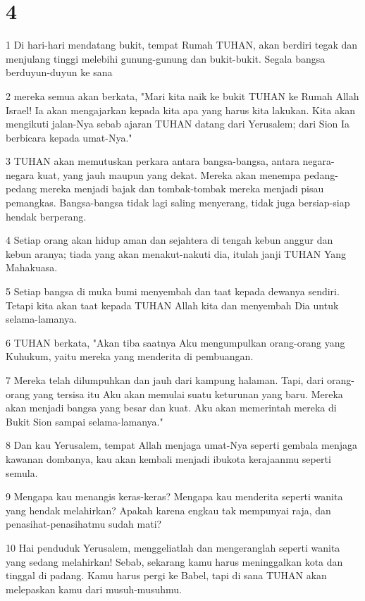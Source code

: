 \chapter{4}

\par 1 Di hari-hari mendatang bukit, tempat Rumah TUHAN, akan berdiri tegak dan menjulang tinggi melebihi gunung-gunung dan bukit-bukit. Segala bangsa berduyun-duyun ke sana
\par 2 mereka semua akan berkata, "Mari kita naik ke bukit TUHAN ke Rumah Allah Israel! Ia akan mengajarkan kepada kita apa yang harus kita lakukan. Kita akan mengikuti jalan-Nya sebab ajaran TUHAN datang dari Yerusalem; dari Sion Ia berbicara kepada umat-Nya."
\par 3 TUHAN akan memutuskan perkara antara bangsa-bangsa, antara negara-negara kuat, yang jauh maupun yang dekat. Mereka akan menempa pedang-pedang mereka menjadi bajak dan tombak-tombak mereka menjadi pisau pemangkas. Bangsa-bangsa tidak lagi saling menyerang, tidak juga bersiap-siap hendak berperang.
\par 4 Setiap orang akan hidup aman dan sejahtera di tengah kebun anggur dan kebun aranya; tiada yang akan menakut-nakuti dia, itulah janji TUHAN Yang Mahakuasa.
\par 5 Setiap bangsa di muka bumi menyembah dan taat kepada dewanya sendiri. Tetapi kita akan taat kepada TUHAN Allah kita dan menyembah Dia untuk selama-lamanya.
\par 6 TUHAN berkata, "Akan tiba saatnya Aku mengumpulkan orang-orang yang Kuhukum, yaitu mereka yang menderita di pembuangan.
\par 7 Mereka telah dilumpuhkan dan jauh dari kampung halaman. Tapi, dari orang-orang yang tersisa itu Aku akan memulai suatu keturunan yang baru. Mereka akan menjadi bangsa yang besar dan kuat. Aku akan memerintah mereka di Bukit Sion sampai selama-lamanya."
\par 8 Dan kau Yerusalem, tempat Allah menjaga umat-Nya seperti gembala menjaga kawanan dombanya, kau akan kembali menjadi ibukota kerajaanmu seperti semula.
\par 9 Mengapa kau menangis keras-keras? Mengapa kau menderita seperti wanita yang hendak melahirkan? Apakah karena engkau tak mempunyai raja, dan penasihat-penasihatmu sudah mati?
\par 10 Hai penduduk Yerusalem, menggeliatlah dan mengeranglah seperti wanita yang sedang melahirkan! Sebab, sekarang kamu harus meninggalkan kota dan tinggal di padang. Kamu harus pergi ke Babel, tapi di sana TUHAN akan melepaskan kamu dari musuh-musuhmu.

